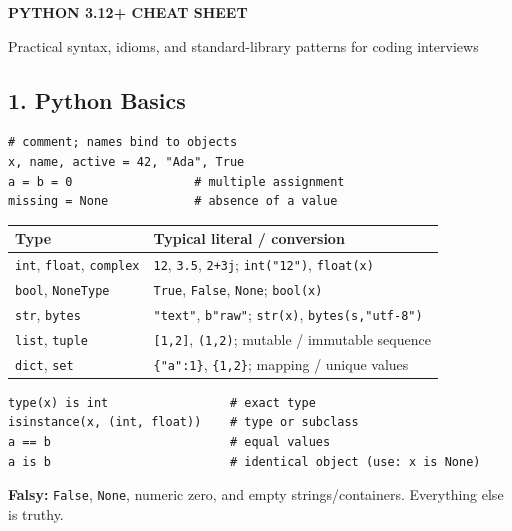 \documentclass[10pt,a4paper]{article}
\newcommand{\py}[1]{\texttt{#1}}
\newenvironment{tbl}{\par\begin{lrbox}{\tblbox}\begin{minipage}{\linewidth}\compacttable}%
  {\end{minipage}\end{lrbox}\noindent\raisebox{\dp\tblbox}{\usebox{\tblbox}}\par}
\newcommand{\compacttable}{\fontsize{10}{11.2}\selectfont\setlength{\tabcolsep}{2.5pt}\renewcommand{\arraystretch}{1.08}}
\begin{document}
\begin{center}
  {\color{Navy}\bfseries\fontsize{16}{17}\selectfont PYTHON 3.12+ CHEAT SHEET}\par
  \vspace{1pt}
  {\color{CodeGray}\fontsize{9}{10}\selectfont Practical syntax, idioms, and standard-library patterns for coding interviews}
\end{center}
\vspace{-3pt}

\begin{multicols}{2}

\section{1. Python Basics}

\begin{lstlisting}
# comment; names bind to objects
x, name, active = 42, "Ada", True
a = b = 0                 # multiple assignment
missing = None            # absence of a value
\end{lstlisting}

\begin{tbl}
\begin{tabularx}{\linewidth}{@{}R{.28\linewidth}L@{}}
\toprule
\textbf{Type} & \textbf{Typical literal / conversion} \\
\midrule
\py{int}, \py{float}, \py{complex} & \py{12}, \py{3.5}, \py{2+3j}; \py{int("12")}, \py{float(x)} \\
\py{bool}, \py{NoneType} & \py{True}, \py{False}, \py{None}; \py{bool(x)} \\
\py{str}, \py{bytes} & \py{"text"}, \py{b"raw"}; \py{str(x)}, \py{bytes(s,"utf-8")} \\
\py{list}, \py{tuple} & \py{[1,2]}, \py{(1,2)}; mutable / immutable sequence \\
\py{dict}, \py{set} & \py{\{"a":1\}}, \py{\{1,2\}}; mapping / unique values \\
\bottomrule
\end{tabularx}
\end{tbl}

\begin{lstlisting}
type(x) is int                 # exact type
isinstance(x, (int, float))    # type or subclass
a == b                         # equal values
a is b                         # identical object (use: x is None)
\end{lstlisting}

\textbf{Falsy:} \py{False}, \py{None}, numeric zero, and empty strings/containers. Everything else is truthy.


\end{multicols}
\end{document}
